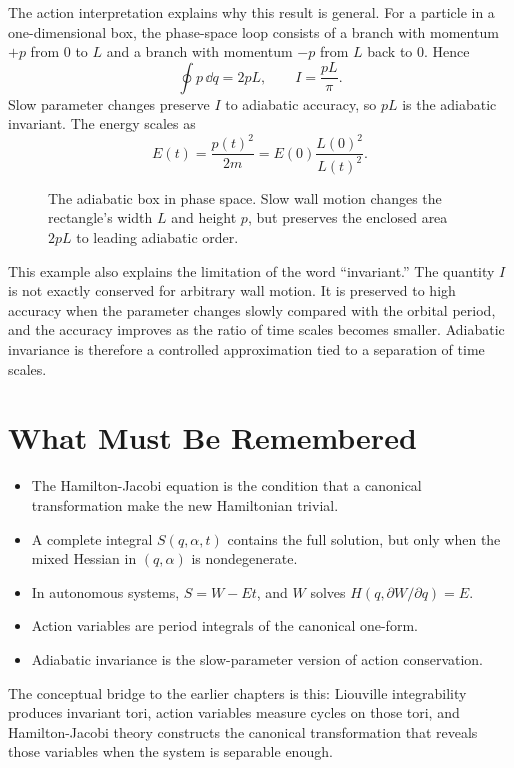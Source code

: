 The action interpretation explains why this result is general. For a particle
in a one-dimensional box, the phase-space loop consists of a branch with
momentum \(+p\) from \(0\) to \(L\) and a branch with momentum \(-p\) from
\(L\) back to \(0\). Hence
\[
  \oint p\,\dd q=2pL,
  \qquad
  I=\frac{pL}{\pi}.
\]
Slow parameter changes preserve \(I\) to adiabatic accuracy, so \(pL\) is the
adiabatic invariant. The energy scales as
\[
  E(t)=\frac{p(t)^2}{2m}
  =
  E(0)\frac{L(0)^2}{L(t)^2}.
\]

\begin{figure}[htbp]
\centering
{}
\caption{The adiabatic box in phase space. Slow wall motion changes the
rectangle's width \(L\) and height \(p\), but preserves the enclosed area
\(2pL\) to leading adiabatic order.}
\label{fig:adiabatic-box-action}
\end{figure}

This example also explains the limitation of the word ``invariant.'' The
quantity \(I\) is not exactly conserved for arbitrary wall motion. It is
preserved to high accuracy when the parameter changes slowly compared with the
orbital period, and the accuracy improves as the ratio of time scales becomes
smaller. Adiabatic invariance is therefore a controlled approximation tied to a
separation of time scales.

\section{What Must Be Remembered}
\label{sec:hj-summary}

\begin{itemize}
\item The Hamilton-Jacobi equation is the condition that a canonical
transformation make the new Hamiltonian trivial.
\item A complete integral \(S(q,\alpha,t)\) contains the full solution, but
only when the mixed Hessian in \((q,\alpha)\) is nondegenerate.
\item In autonomous systems, \(S=W-Et\), and \(W\) solves
\(H(q,\partial W/\partial q)=E\).
\item Action variables are period integrals of the canonical one-form.
\item Adiabatic invariance is the slow-parameter version of action
conservation.
\end{itemize}

The conceptual bridge to the earlier chapters is this: Liouville integrability
produces invariant tori, action variables measure cycles on those tori, and
Hamilton-Jacobi theory constructs the canonical transformation that reveals
those variables when the system is separable enough.
